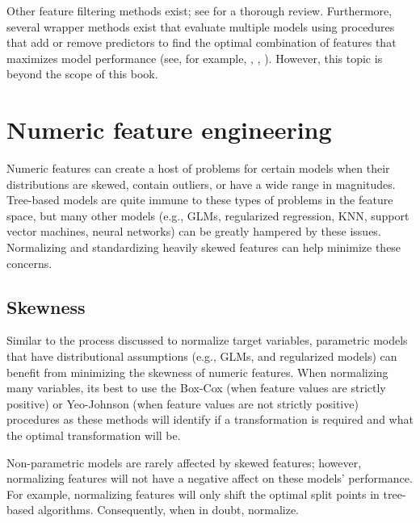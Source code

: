 \documentclass[]{krantz}
\makeatletter
\newenvironment{kframe}{%
\medskip{}
\setlength{\fboxsep}{.8em}
 \def\at@end@of@kframe{}%
 \ifinner\ifhmode%
  \def\at@end@of@kframe{\end{minipage}}%
  \begin{minipage}{\columnwidth}%
 \fi\fi%
 \def\FrameCommand##1{\hskip\@totalleftmargin \hskip-\fboxsep
 \colorbox{shadecolor}{##1}\hskip-\fboxsep
     \hskip-\linewidth \hskip-\@totalleftmargin \hskip\columnwidth}%
 \MakeFramed {\advance\hsize-\width
   \@totalleftmargin\z@ \linewidth\hsize
   \@setminipage}}%
 {\par\unskip\endMakeFramed%
 \at@end@of@kframe}
\newenvironment{block}[1]
  {
  \begin{itemize}
  \renewcommand{\labelitemi}{
    \raisebox{-.7\height}[0pt][0pt]{
      {\setkeys{Gin}{width=3em,keepaspectratio}\texttt{[image: icons/\#1]}}
    }
  }
  \setlength{\fboxsep}{1em}
  \begin{kframe}
  \item
  }
  {
  \end{kframe}
  \end{itemize}
  }
\newenvironment{note}
  {\begin{block}{note}}
  {\end{block}}
\makeatother
\begin{document}
Other feature filtering methods exist; see \citet{saeys2007review} for a thorough review. Furthermore, several wrapper methods exist that evaluate multiple models using procedures that add or remove predictors to find the optimal combination of features that maximizes model performance (see, for example, \citet{kursa2010feature}, \citet{granitto2006recursive}, \citet{maldonado2009wrapper}). However, this topic is beyond the scope of this book.

\hypertarget{numeric-feature-engineering}{%
\section{Numeric feature engineering}\label{numeric-feature-engineering}}

Numeric features can create a host of problems for certain models when their distributions are skewed, contain outliers, or have a wide range in magnitudes. Tree-based models are quite immune to these types of problems in the feature space, but many other models (e.g., GLMs, regularized regression, KNN, support vector machines, neural networks) can be greatly hampered by these issues. Normalizing and standardizing heavily skewed features can help minimize these concerns.

\hypertarget{skewness}{%
\subsection{Skewness}\label{skewness}}

Similar to the process discussed to normalize target variables, parametric models that have distributional assumptions (e.g., GLMs, and regularized models) can benefit from minimizing the skewness of numeric features. When normalizing many variables, its best to use the Box-Cox (when feature values are strictly positive) or Yeo-Johnson (when feature values are not strictly positive) procedures as these methods will identify if a transformation is required and what the optimal transformation will be.

\begin{note}
Non-parametric models are rarely affected by skewed features; however,
normalizing features will not have a negative affect on these models'
performance. For example, normalizing features will only shift the
optimal split points in tree-based algorithms. Consequently, when in
doubt, normalize.
\end{note}
\end{document}
